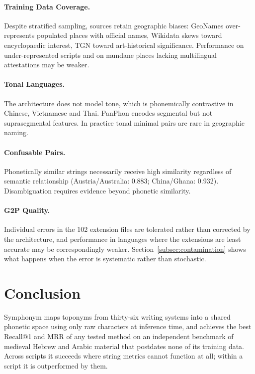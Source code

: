 \documentclass[11pt,a4paper]{article}
\begin{document}
\paragraph{Training Data Coverage.} Despite stratified sampling, sources retain geographic biases: GeoNames over-represents populated places with official names, Wikidata skews toward encyclopaedic interest, TGN toward art-historical significance. Performance on under-represented scripts and on mundane places lacking multilingual attestations may be weaker.

\paragraph{Tonal Languages.} The architecture does not model tone, which is phonemically contrastive in Chinese, Vietnamese and Thai. PanPhon encodes segmental but not suprasegmental features. In practice tonal minimal pairs are rare in geographic naming.

\paragraph{Confusable Pairs.} Phonetically similar strings necessarily receive high similarity regardless of semantic relationship (Austria/Australia: 0.883; China/Ghana: 0.932). Disambiguation requires evidence beyond phonetic similarity.

\paragraph{G2P Quality.} Individual errors in the 102 extension files are tolerated rather than corrected by the architecture, and performance in languages where the extensions are least accurate may be correspondingly weaker. Section~\ref{subsec:contamination} shows what happens when the error is systematic rather than stochastic.

\section{Conclusion}
\label{sec:conclusion}

Symphonym maps toponyms from thirty-six writing systems into a shared phonetic space using only raw characters at inference time, and achieves the best Recall@1 and MRR of any tested method on an independent benchmark of medieval Hebrew and Arabic material that postdates none of its training data. Across scripts it succeeds where string metrics cannot function at all; within a script it is outperformed by them.
\end{document}
